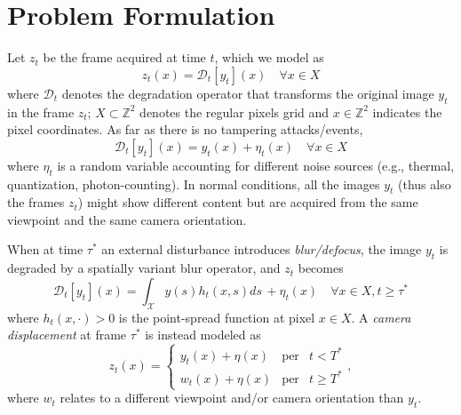 \documentclass{llncs}
\begin{document}
\section{Problem Formulation}\label{sec:probForm}

Let $z_t$ be the frame acquired at time $t$, which we model as
\begin{equation}
\label{eq:observationModel}
z_t(x)=\mathcal{D}_t[y_t](x) \quad \forall x \in X
\end{equation}
where $\mathcal{D}_t$ denotes the degradation operator that transforms the original image $y_t$ in the frame $z_t$; $X \subset \mathbb{Z}^2$ denotes the regular pixels grid and $x\in \mathbb{Z}^2$ indicates the pixel coordinates. As far as there is no tampering attacks/events,
\begin{equation}
\label{eq:no_tampering}
\mathcal{D}_t[y_t](x) = y_t(x) + \eta_t(x) \quad \forall x \in X
\end{equation}
where $\eta_t$ is a random variable accounting for different noise sources (e.g., thermal, quantization, photon-counting). In normal conditions, all the images $y_t$ (thus also the frames $z_t$) might show different content but are acquired from the same viewpoint and the same camera orientation.

When at time $\tau^*$ an external disturbance introduces \emph{blur/defocus}, the image $y_t$ is degraded by a spatially variant blur operator, and $z_t$ becomes
\begin{equation}
\label{eq:model_defocus}
\mathcal{D}_t[y_t](x) = \int_{\mathcal{X}}y(s)h_t(x,s)ds\, + \eta_t(x) \quad \forall x \in X, t \geq \tau^*
\end{equation}
where $h_t(x,\cdot) > 0$ is the point-spread function at pixel $x \in X$.
%
A \emph{camera displacement} at frame $\tau^*$ is instead modeled as 
\begin{equation}
\label{eq:model_displacement}
z_t(x)  = \left\{ \begin{array}{rcl}
y_t(x) + \eta(x) & \mbox{per} & t < T^* \\
w_t(x) + \eta(x) & \mbox{per} & t \geqslant T^*
\end{array}\right. ,
\end{equation}
where $w_t$ relates to a different viewpoint and/or camera orientation than $y_t$. 
\end{document}
